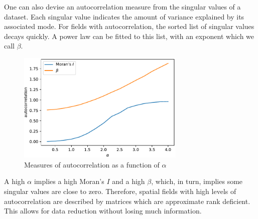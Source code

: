 \documentclass[ijgi,article,submit,moreauthors,pdftex,10pt,a4paper]{Definitions/mdpi}
\begin{document}
One can also devise an autocorrelation measure from the singular values of a dataset. Each singular value indicates the amount of variance explained by its associated mode. For fields with autocorrelation, the sorted list of singular values decays quickly. A power law can be fitted to this list, with an exponent which we call $\beta$.

\begin{figure}[H]
\centering
\includegraphics[width=80mm]{Results/plotMoransIAndBeta.pdf}
\caption[Various measures of autocorrelation]{Measures of autocorrelation as a function of $\alpha$}
\label{fig:plotGammaAndMoransIAndBeta}
\end{figure}

A high $\alpha$ implies a high Moran's $I$ and a high $\beta$, which, in turn, implies some singular values are close to zero. Therefore, spatial fields with high levels of autocorrelation are described by matrices which are approximate rank deficient. This allows for data reduction without losing much information.


\end{document}

